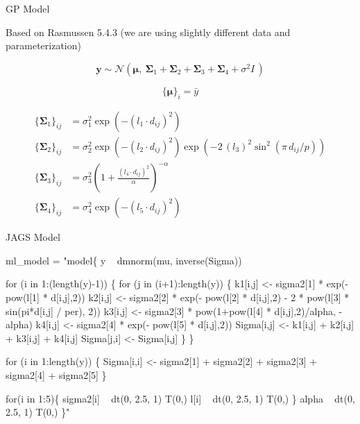 \documentclass[11pt,ignorenonframetext,]{beamer}
\newenvironment{Shaded}{}{}
\newcommand{\NormalTok}[1]{#1}
\newcommand{\StringTok}[1]{\textcolor[rgb]{0.25,0.44,0.63}{#1}}
\let\oldShaded\Shaded
\let\endoldShaded\endShaded
\renewenvironment{Shaded}{\footnotesize\begin{spacing}{0.9}\oldShaded}{\endoldShaded\end{spacing}}
\let\oldverbatim\verbatim
\let\endoldverbatim\endverbatim
\newcommand{\scriptoutput}{
  \renewenvironment{Shaded}{\scriptsize\begin{spacing}{0.9}\oldShaded}{\endoldShaded\end{spacing}}
  \renewenvironment{verbatim}{\scriptsize\begin{spacing}{0.9}\oldverbatim}{\endoldverbatim\end{spacing}}
}
\begin{document}
\begin{frame}[t]{GP Model}
\protect\hypertarget{gp-model}{}

Based on Rasmussen 5.4.3 (we are using slightly different data and
parameterization)

\[ \symbf{y} \sim \mathcal{N}(\symbf{\mu},~ \symbf{\Sigma}_1 + \symbf{\Sigma}_2 + \symbf{\Sigma}_3 + \symbf{\Sigma}_4 + \sigma^2 \mathit{I}\,) \]

\[\{\symbf{\mu}\}_i = \bar{y}\]

\[
\begin{aligned}
\{\symbf{\Sigma}_1\}_{ij} &= \sigma^2_1 \exp\left(-(l_1 \cdot d_{ij})^2\right) \\
\{\symbf{\Sigma}_2\}_{ij} &= \sigma^2_2 \exp\left(-(l_2 \cdot d_{ij})^2\right)\exp\left(-2 \, (l_3)^2  \sin^2(\pi \, d_{ij} / p)\right) \\
\{\symbf{\Sigma}_3\}_{ij} &= \sigma^2_3 \left(1+\frac{(l_4 \cdot d_{ij})^2}{\alpha}\right)^{-\alpha} \\
\{\symbf{\Sigma}_4\}_{ij} &= \sigma^2_4 \exp\left(-(l_5 \cdot d_{ij})^2\right)
\end{aligned}
\]

\end{frame}

\begin{frame}[fragile]{JAGS Model}
\protect\hypertarget{jags-model}{}

\scriptoutput

\begin{Shaded}
\begin{Highlighting}[]
\NormalTok{ml_model =}\StringTok{ "model\{}
\StringTok{  y ~ dmnorm(mu, inverse(Sigma))}

\StringTok{  for (i in 1:(length(y)-1)) \{}
\StringTok{    for (j in (i+1):length(y)) \{}
\StringTok{      k1[i,j] <- sigma2[1] * exp(- pow(l[1] * d[i,j],2))}
\StringTok{      k2[i,j] <- sigma2[2] * exp(- pow(l[2] * d[i,j],2) - 2 * pow(l[3] * sin(pi*d[i,j] / per), 2))}
\StringTok{      k3[i,j] <- sigma2[3] * pow(1+pow(l[4] * d[i,j],2)/alpha, -alpha)}
\StringTok{      k4[i,j] <- sigma2[4] * exp(- pow(l[5] * d[i,j],2))}
\StringTok{      }
\StringTok{      Sigma[i,j] <- k1[i,j] + k2[i,j] + k3[i,j] + k4[i,j]}
\StringTok{      Sigma[j,i] <- Sigma[i,j]}
\StringTok{    \}}
\StringTok{  \}}

\StringTok{  for (i in 1:length(y)) \{}
\StringTok{    Sigma[i,i] <- sigma2[1] + sigma2[2] + sigma2[3] + sigma2[4] + sigma2[5]}
\StringTok{  \}  }

\StringTok{  for(i in 1:5)\{}
\StringTok{    sigma2[i] ~ dt(0, 2.5, 1) T(0,)}
\StringTok{    l[i] ~ dt(0, 2.5, 1) T(0,)}
\StringTok{  \}}
\StringTok{  alpha ~ dt(0, 2.5, 1) T(0,)}
\StringTok{\}"}
\end{Highlighting}
\end{Shaded}

\end{frame}
\end{document}
